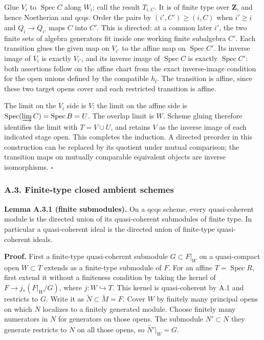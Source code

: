 \documentclass[11pt]{article}
\begin{document}
Glue \(V_i\) to \(\operatorname{Spec}C\) along \(W_i\); call the result
\(T_{i,C}\). It is of finite type over \(\mathbf Z\), and hence
Noetherian and qcqs. Order the pairs by \((i',C')\ge(i,C)\) when
\(i'\ge i\) and \(Q_i\to Q_{i'}\) maps \(C\) into \(C'\). This is
directed: at a common later \(i'\), the two finite sets of algebra
generators fit inside one working finite subalgebra \(C'\). Each
transition glues the given map on \(V_{i'}\) to the affine map on
\(\operatorname{Spec}C'\). Its inverse image of \(V_i\) is exactly
\(V_{i'}\), and its inverse image of \(\operatorname{Spec}C\) is exactly
\(\operatorname{Spec}C'\): both assertions follow on the affine chart
from the exact inverse-image condition for the open unions defined by
the compatible \(h_l\). The transition is affine, since these two target
opens cover and each restricted transition is affine.

The limit on the \(V_i\) side is \(V\); the limit on the affine side is
\(\operatorname{Spec}(\varinjlim C)=\operatorname{Spec}B=U\). The
overlap limit is \(W\). Scheme gluing therefore identifies the limit
with \(T=V\cup U\), and retains \(V\) as the inverse image of each
indicated stage open. This completes the induction. A directed preorder
in this construction can be replaced by its quotient under mutual
comparison; the transition maps on mutually comparable equivalent
objects are inverse isomorphisms. \(\square\)

\subsubsection{A.3. Finite-type closed ambient
schemes}\label{a.3.-finite-type-closed-ambient-schemes}

\textbf{Lemma A.3.1 (finite submodules).} On a qcqs scheme, every
quasi-coherent module is the directed union of its quasi-coherent
submodules of finite type. In particular a quasi-coherent ideal is the
directed union of finite-type quasi-coherent ideals.

\textbf{Proof.} First a finite-type quasi-coherent submodule
\(G\subset F|_W\) on a quasi-compact open \(W\subset T\) extends as a
finite-type submodule of \(F\). For an affine
\(T=\operatorname{Spec}R\), first extend it without a finiteness
condition by taking the kernel of \(F\to j_*(F|_W/G)\), where
\(j:W\hookrightarrow T\). This kernel is quasi-coherent by A.1 and
restricts to \(G\). Write it as \(\widetilde N\subset\widetilde M=F\).
Cover \(W\) by finitely many principal opens on which \(N\) localizes to
a finitely generated module. Choose finitely many numerators in \(N\)
for generators on those opens. The submodule \(N'\subset N\) they
generate restricts to \(N\) on all those opens, so
\(\widetilde{N'}|_W=G\).
\end{document}
